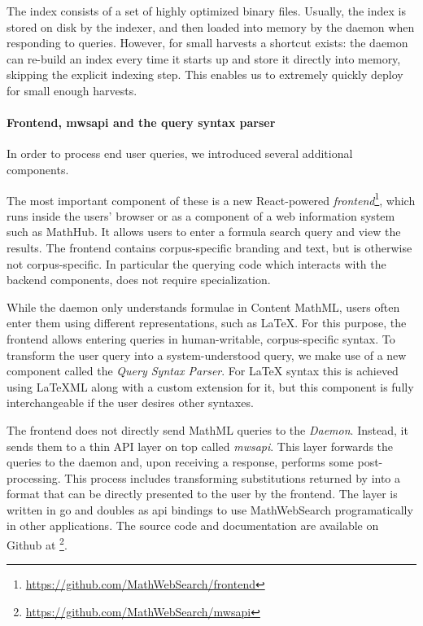 The index consists of a set of highly optimized binary files. 
Usually, the index is stored on disk by the indexer, and then loaded into memory by the \MWS daemon when responding to queries. 
However, for small harvests a shortcut exists: the \MWS daemon can re-build an index every time it starts up and store it directly into memory, skipping the explicit indexing step. 
This enables us to extremely quickly deploy \MWS for small enough harvests. 
\paragraph{Frontend, mwsapi and the query syntax parser}

In order to process end user queries, we introduced several additional components.

The most important component of these is a new React-powered \textit{frontend}\footnote{\url{https://github.com/MathWebSearch/frontend}}, which runs inside the users' browser or as a component of a web information system such as MathHub. 
It allows users to enter a formula search query and view the results. 
The frontend contains corpus-specific branding and text, but is otherwise not corpus-specific. 
In particular the querying code which interacts with the backend components, does not require specialization. 

While the \MWS daemon only understands formulae in Content MathML, users often enter them using different representations, such as \LaTeX. 
For this purpose, the frontend allows entering queries in human-writable, corpus-specific syntax. 
To transform the user query into a system-understood query, we make use of a new component called the \textit{Query Syntax Parser}. 
For {\LaTeX} syntax this is achieved using {\LaTeX}ML  along with a custom \MWS extension for it, but this component is fully interchangeable if the user desires other syntaxes. 

The frontend does not directly send MathML queries to the \textit{Daemon}.
Instead, it sends them to a thin API layer on top called \textit{mwsapi}. 
This layer forwards the queries to the daemon and, upon receiving a response, performs some post-processing. 
This process includes transforming substitutions returned by \MWS into a format that can be directly presented to the user by the frontend. 
The layer is written in go and doubles as api bindings to use MathWebSearch programatically in other applications. 
The source code and documentation are available on Github at \footnote{\url{https://github.com/MathWebSearch/mwsapi}}. 

